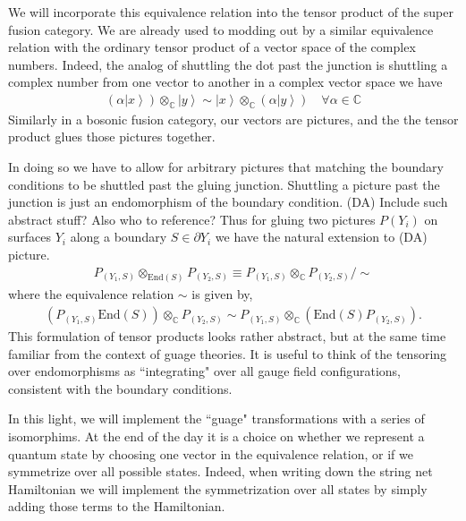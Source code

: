 \documentclass[12pt,a4paper]{article}
\newcommand{\tp}{\otimes}
\newcommand{\ket}[1]{\ensuremath{\left|#1\right\rangle}}
\newcommand{\dave}[1]{{\color{ao(english)}\footnotesize{(DA) #1}}}
\begin{document}
We will incorporate this equivalence relation into the tensor product of the super fusion category.
We are already used to modding out by a similar equivalence relation with the ordinary tensor product of a vector space of the complex numbers. 
Indeed, the analog of shuttling the dot past the junction is shuttling a complex number from one vector to another in a complex vector space we have 
\begin{align}
(\alpha \ket{x}) \tp_\mathbb{C} \ket{y} \sim \ket{x} \tp_\mathbb{C} (\alpha \ket{y}) \quad \forall \alpha \in \mathbb{C}
\end{align}
Similarly in a bosonic fusion category, our vectors are pictures, and the the tensor product glues those pictures together. 

In doing so we have to allow for arbitrary pictures  that matching the boundary conditions to be shuttled past the gluing junction. 
Shuttling a picture past the junction is just an endomorphism of the boundary condition. \dave{Include such abstract stuff? Also who to reference?}
Thus for gluing two pictures $P(Y_i)$ on surfaces $Y_i$  along a boundary $S \in \partial Y_i$ we have the natural extension to \dave{picture.}
\begin{align}
P_{(Y_1, S)} \tp_{\text{End}(S)}P_{(Y_2,S)} \equiv P_{(Y_1,S)} \tp_{\mathbb{C}} P_{(Y_2,S)} /\sim
\end{align}
where the equivalence relation $\sim$ is given by,
\begin{align}
 (P_{(Y_1,S)} \text{End}(S)) \tp_{\mathbb{C}} P_{(Y_2,S)}  \sim P_{(Y_1,S)} \tp_{\mathbb{C}} (\text{End}(S) P_{(Y_2,S)}). 
\end{align}
This formulation of tensor products looks rather abstract, but at the same time familiar from the context of guage theories. 
It is useful to think of the tensoring over endomorphisms as ``integrating" over all gauge field configurations, consistent with the boundary conditions.

In this light, we will implement the ``guage" transformations with a series of isomorphims. 
At the end of the day it is a choice on whether we represent a quantum state by choosing one vector in the equivalence relation, or if we symmetrize over all possible states. 
Indeed, when writing down the string net Hamiltonian we will implement the symmetrization over all states by simply adding those terms to the Hamiltonian. 
\end{document}
